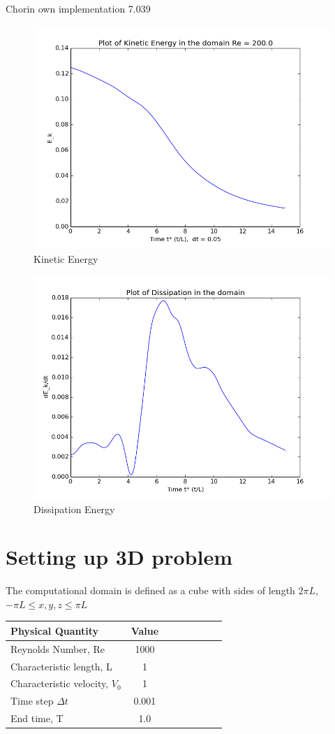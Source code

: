 \documentclass[a4paper,norsk]{article}
\begin{document}
Chorin own implementation 7.039

\begin{figure}[h!]
	\centering
	\caption*{Kinetic Energy}
	\includegraphics[scale=0.6]{3D/Et.png}
\end{figure}

\begin{figure}[h!]
	\centering
	\caption*{Dissipation Energy}
	\includegraphics[scale=0.6]{3D/dissi.png}
\end{figure}

\section*{Setting up 3D problem}
The computational domain is defined as a cube with sides of length $2 \pi L$, $-\pi L \leq x,y,z \leq \pi L$

\begin{tabular}{l*{6}{c}r}
Physical Quantity              & Value  \\
\hline
Reynolds Number, Re & 1000   \\
Characteristic length, L           & 1     \\
Characteristic velocity, $V_{0}$   & 1     \\
Time step $\Delta t$ 			   & 0.001 \\
End time, T 					   & 1.0
\end{tabular}
\end{document}
